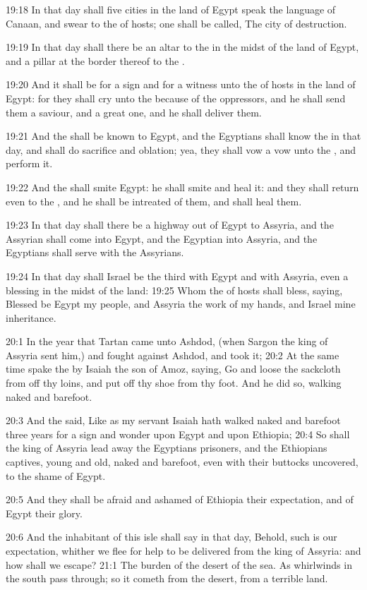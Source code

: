 19:18 In that day shall five cities in the land of Egypt speak the
language of Canaan, and swear to the \LORD of hosts; one shall be
called, The city of destruction.

19:19 In that day shall there be an altar to the \LORD in the midst of
the land of Egypt, and a pillar at the border thereof to the \LORD.

19:20 And it shall be for a sign and for a witness unto the \LORD of
hosts in the land of Egypt: for they shall cry unto the \LORD because
of the oppressors, and he shall send them a saviour, and a great one,
and he shall deliver them.

19:21 And the \LORD shall be known to Egypt, and the Egyptians shall
know the \LORD in that day, and shall do sacrifice and oblation; yea,
they shall vow a vow unto the \LORD, and perform it.

19:22 And the \LORD shall smite Egypt: he shall smite and heal it: and
they shall return even to the \LORD, and he shall be intreated of them,
and shall heal them.

19:23 In that day shall there be a highway out of Egypt to Assyria,
and the Assyrian shall come into Egypt, and the Egyptian into Assyria,
and the Egyptians shall serve with the Assyrians.

19:24 In that day shall Israel be the third with Egypt and with
Assyria, even a blessing in the midst of the land: 19:25 Whom the \LORD
of hosts shall bless, saying, Blessed be Egypt my people, and Assyria
the work of my hands, and Israel mine inheritance.

20:1 In the year that Tartan came unto Ashdod, (when Sargon the king
of Assyria sent him,) and fought against Ashdod, and took it; 20:2 At
the same time spake the \LORD by Isaiah the son of Amoz, saying, Go and
loose the sackcloth from off thy loins, and put off thy shoe from thy
foot. And he did so, walking naked and barefoot.

20:3 And the \LORD said, Like as my servant Isaiah hath walked naked
and barefoot three years for a sign and wonder upon Egypt and upon
Ethiopia; 20:4 So shall the king of Assyria lead away the Egyptians
prisoners, and the Ethiopians captives, young and old, naked and
barefoot, even with their buttocks uncovered, to the shame of Egypt.

20:5 And they shall be afraid and ashamed of Ethiopia their
expectation, and of Egypt their glory.

20:6 And the inhabitant of this isle shall say in that day, Behold,
such is our expectation, whither we flee for help to be delivered from
the king of Assyria: and how shall we escape?  21:1 The burden of the
desert of the sea. As whirlwinds in the south pass through; so it
cometh from the desert, from a terrible land.

